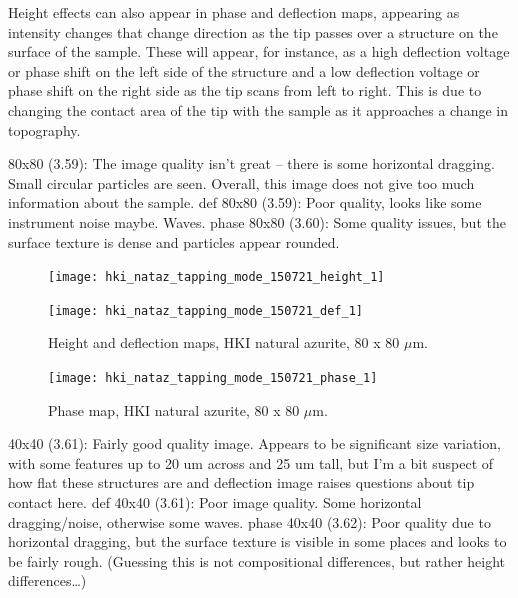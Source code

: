 Height effects can also appear in phase and deflection maps, appearing as intensity changes that change direction as the tip passes over a structure on the surface of the sample. These will appear, for instance, as a high deflection voltage or phase shift on the left side of the structure and a low deflection voltage or phase shift on the right side as the tip scans from left to right. This is due to changing the contact area of the tip with the sample as it approaches a change in topography.~\autocite{iscpi} 



80x80 (3.59): The image quality isn’t great – there is some horizontal dragging. Small circular particles are seen. Overall, this image does not give too much information about the sample.
def 80x80 (3.59): Poor quality, looks like some instrument noise maybe. Waves.
phase 80x80 (3.60): Some quality issues, but the surface texture is dense and particles appear rounded. 


\begin{figure}[H]
\centering
\begin{minipage}{.45\textwidth}
  \centering
  \texttt{[image: hki\_nataz\_tapping\_mode\_150721\_height\_1]}
\end{minipage}
\begin{minipage}{.45\textwidth}
  \centering
  \texttt{[image: hki\_nataz\_tapping\_mode\_150721\_def\_1]}
\end{minipage}
\caption[Height and deflection maps, HKI natural azurite]{Height and deflection maps, HKI natural azurite, 80 x 80 $\mu$m.}
\label{fig:afm_hki_nataz_height_def_1}
\end{figure}

\begin{figure}[H]
\centering
  \texttt{[image: hki\_nataz\_tapping\_mode\_150721\_phase\_1]}
\caption[Phase map, HKI natural azurite]{Phase map, HKI natural azurite, 80 x 80 $\mu$m.}
\label{fig:afm_hki_nataz_phase_1}
\end{figure}

40x40 (3.61): Fairly good quality image. Appears to be significant size variation, with some features up to 20 um across and 25 um tall, but I’m a bit suspect of how flat these structures are and deflection image raises questions about tip contact here.
def 40x40 (3.61): Poor image quality. Some horizontal dragging/noise, otherwise some waves.
phase 40x40 (3.62): Poor quality due to horizontal dragging, but the surface texture is visible in some places and looks to be fairly rough. (Guessing this is not compositional differences, but rather height differences…)


